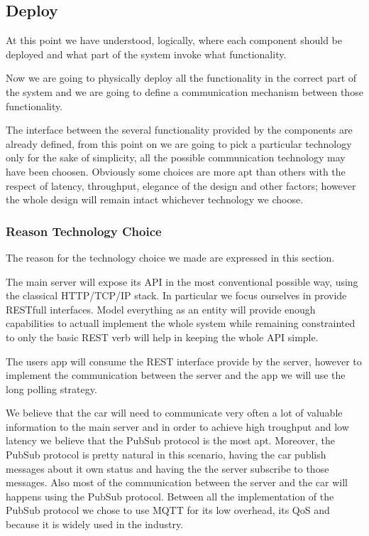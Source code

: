 \documentclass[11pt]{article} %
\begin{document}
\subsection{Deploy}

At this point we have understood, logically, where each component should be deployed and what part of the system invoke what functionality.

Now we are going to physically deploy all the functionality in the correct part of the system and we are going to define a communication mechanism between those functionality.

The interface between the several functionality provided by the components are already defined, from this point on we are going to pick a particular technology only for the sake of simplicity, all the possible communication technology may have been choosen. Obviously some choices are more apt than others with the respect of latency, throughput, elegance of the design and other factors; however the whole design will remain intact whichever technology we choose.

\subsubsection{Reason Technology Choice}

The reason for the technology choice we made are expressed in this section.

The main server will expose its API in the most conventional possible way, using the classical HTTP/TCP/IP stack. In particular we focus ourselves in provide RESTfull interfaces. Model everything as an entity will provide enough capabilities to actuall implement the whole system while remaining constrainted to only the basic REST verb will help in keeping the whole API simple.

The users app will consume the REST interface provide by the server, however to implement the communication between the server and the app we will use the long polling strategy.

We believe that the car will need to communicate very often a lot of valuable information to the main server and in order to achieve high troughput and low latency we believe that the PubSub protocol is the most apt. Moreover, the PubSub protocol is pretty natural in this scenario, having the car publish messages about it own status and having the the server subscribe to those messages. Also most of the communication between the server and the car will happens using the PubSub protocol. Between all the implementation of the PubSub protocol we chose to use MQTT for its low overhead, its QoS and because it is widely used in the industry.
\end{document}
